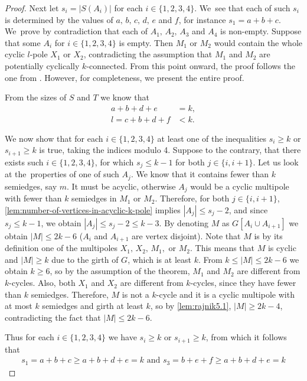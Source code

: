 \documentclass[12pt, twoside]{book}
\begin{document}
\begin{proof}
	Next let $s_i=|S(A_i)|$ for each $i\in\{1,2,3,4\}$. We~see that each of such $s_i$ is determined by the values of $a,\,b,\,c,\,d,\,e$ and $f$, for instance $s_1=a+b+c$. We~prove by contradiction that each of $A_1, \,A_2,\,A_3$ and $A_4$ is non-empty. Suppose that some $A_i$ for $i\in\{1,2,3,4\}$ is empty. Then $M_1$ or $M_2$ would contain the whole cyclic $l$-pole $X_1$ or $X_2$, contradicting the assumption that $M_1$ and $M_2$ are potentially cyclically $k$-connected. From this point onward, the proof follows the one from \mbox{\cite[Theorem 5.2]{Rajnik_phd}}. However, for completeness, we present the entire proof.
	
	From the sizes of $S$ and $T$ we know that
	\begin{align*}
		a+b+d+e &= k,\\
		l=c+b+d+f &< k.
	\end{align*}
	
	We now show that for each $i\in\{1,2,3,4\}$ at least one of the inequalities $s_i\geq k$ or $s_{i+1}\geq k$ is true, taking the indices modulo 4. Suppose to the contrary, that there exists such $i\in\{1,2,3,4\}$, for which $s_j\leq k-1$ for both $j\in\{i, i+1\}$. Let us look at the~properties of one of such $A_j$. We know that it contains fewer than $k$ semiedges, say $m$. It must be acyclic, otherwise $A_j$ would be a cyclic multipole with fewer than $k$ semiedges in $M_1$ or $M_2$. Therefore, for both $j\in\{i,i+1\}$, \cref{lem:number-of-vertices-in-acyclic-k-pole} implies $|A_j|\leq s_j-2$, and since $s_j\leq k-1$, we obtain $|A_j|\leq s_j-2\leq k-3$. By denoting $M$ as $G[A_i\cup A_{i+1}]$ we obtain $|M|\leq 2k-6$ ($A_i$ and $A_{i+1}$ are vertex disjoint). Note that $M$ is by its definition one of the multipoles $X_1, \,X_2,\,M_1,$ or $M_2$. This means that $M$ is cyclic and $|M|\geq k$ due to the girth of $G$, which is at least $k$. From $k\leq |M|\leq 2k-6$ we obtain $k\geq 6$, so by the assumption of the theorem, $M_1$ and $M_2$ are different from $k$-cycles. Also, both $X_1$ and $X_2$ are different from $k$-cycles, since they have fewer than $k$ semiedges. Therefore, $M$ is not a $k$-cycle and it is a cyclic multipole with at most $k$ semiedges and girth at least $k$, so by \cref{lem:rajnik5.1}, $|M| \geq 2k - 4$, contradicting the fact that $|M|\leq 2k-6$.
	
	Thus for each $i\in\{1,2,3,4\}$ we have $s_i\geq k$ or $s_{i+1}\geq k$, from which it follows that
	\begin{align*}
	s_1 =a+b+c\geq a+b+d+e=k \text{ and } s_3 =b+e+f \geq a+b+d+e=k
	\end{align*}
	

\end{proof}
\end{document}
